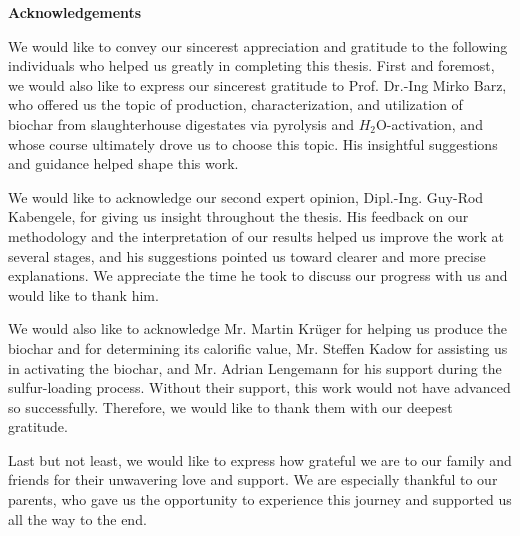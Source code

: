 
 
\begin{center}
\normalsize \textbf{Acknowledgements}\\
\end{center}

    \noindent

We would like to convey our sincerest appreciation and gratitude to the following individuals who helped us greatly in completing this thesis. First and foremost, we would also like to express our sincerest gratitude to Prof. Dr.-Ing Mirko Barz, who offered us the topic of production, characterization, and utilization of biochar from slaughterhouse digestates via pyrolysis and $H_2$O-activation, and whose course ultimately drove us to choose this topic. His insightful suggestions and guidance helped shape this work.

\vspace{0.3em}

We would like to acknowledge our second expert opinion, Dipl.-Ing. Guy-Rod Kabengele, for giving us insight throughout the thesis. His feedback on our methodology and the interpretation of our results helped us improve the work at several stages, and his suggestions pointed us toward clearer and more precise explanations. We appreciate the time he took to discuss our progress with us and would like to thank him. 

\vspace{0.3em}

We would also like to acknowledge Mr. Martin Krüger for helping us produce the biochar and for determining its calorific value, Mr. Steffen Kadow for assisting us in activating the biochar, and Mr. Adrian Lengemann for his support during the sulfur-loading process. Without their support, this work would not have advanced so successfully. Therefore, we would like to thank them with our deepest gratitude. 

\vspace{0.3em}

Last but not least, we would like to express how grateful we are to our family and friends for their unwavering love and support. We are especially thankful to our parents, who gave us the opportunity to experience this journey and supported us all the way to the end.
